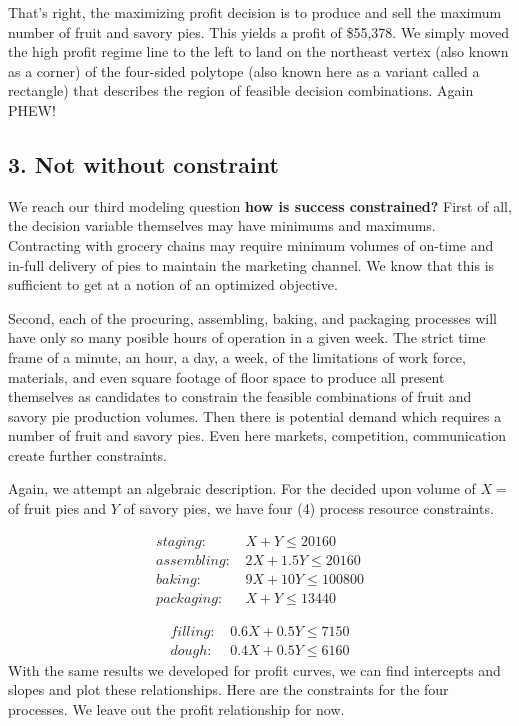 \documentclass[
]{book}
\begin{document}
That's right, the maximizing profit decision is to produce and sell the maximum number of fruit and savory pies. This yields a profit of \$55,378. We simply moved the high profit regime line to the left to land on the northeast vertex (also known as a corner) of the four-sided polytope (also known here as a variant called a rectangle) that describes the region of feasible decision combinations. Again PHEW!

\hypertarget{not-without-constraint}{%
\subsection{3. Not without constraint}\label{not-without-constraint}}

We reach our third modeling question \textbf{how is success constrained?} First of all, the decision variable themselves may have minimums and maximums. Contracting with grocery chains may require minimum volumes of on-time and in-full delivery of pies to maintain the marketing channel. We know that this is sufficient to get at a notion of an optimized objective.

Second, each of the procuring, assembling, baking, and packaging processes will have only so many posible hours of operation in a given week. The strict time frame of a minute, an hour, a day, a week, of the limitations of work force, materials, and even square footage of floor space to produce all present themselves as candidates to constrain the feasible combinations of fruit and savory pie production volumes. Then there is potential demand which requires a number of fruit and savory pies. Even here markets, competition, communication create further constraints.

Again, we attempt an algebraic description. For the decided upon volume of \(X=\) of fruit pies and \(Y\) of savory pies, we have four (4) process resource constraints.

\[
\begin{align}
staging:\, &X + Y \leq 20160 \\
assembling:\, &2 X + 1.5 Y \leq 20160 \\
baking:\, &9 X + 10 Y \leq 100800 \\
packaging:\, &X + Y \leq 13440 
\end{align}
\]

\[
\begin{align}
filling:\, &0.6 X + 0.5 Y \leq 7150 \\
dough:\, &0.4 X + 0.5 Y \leq 6160 
\end{align}
\]
With the same results we developed for profit curves, we can find intercepts and slopes and plot these relationships. Here are the constraints for the four processes. We leave out the profit relationship for now.
\end{document}
